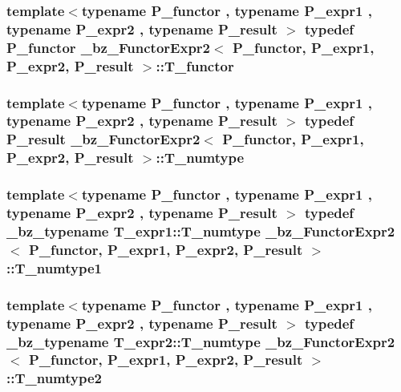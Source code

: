 \subsubsection[{T\+\_\+functor}]{\setlength{\rightskip}{0pt plus 5cm}template$<$typename P\+\_\+functor , typename P\+\_\+expr1 , typename P\+\_\+expr2 , typename P\+\_\+result $>$ typedef P\+\_\+functor {\bf \+\_\+bz\+\_\+\+Functor\+Expr2}$<$ P\+\_\+functor, P\+\_\+expr1, P\+\_\+expr2, P\+\_\+result $>$\+::{\bf T\+\_\+functor}}\label{class__bz__FunctorExpr2_a3fe23ec6c06a2346710d4590986bc1ae}
\hypertarget{class__bz__FunctorExpr2_a72c49dc29bb54d045667666e72ea96a6}{}
\subsubsection[{T\+\_\+numtype}]{\setlength{\rightskip}{0pt plus 5cm}template$<$typename P\+\_\+functor , typename P\+\_\+expr1 , typename P\+\_\+expr2 , typename P\+\_\+result $>$ typedef P\+\_\+result {\bf \+\_\+bz\+\_\+\+Functor\+Expr2}$<$ P\+\_\+functor, P\+\_\+expr1, P\+\_\+expr2, P\+\_\+result $>$\+::{\bf T\+\_\+numtype}}\label{class__bz__FunctorExpr2_a72c49dc29bb54d045667666e72ea96a6}
\hypertarget{class__bz__FunctorExpr2_ae7900fdd57163e00202ee2534db102f9}{}
\subsubsection[{T\+\_\+numtype1}]{\setlength{\rightskip}{0pt plus 5cm}template$<$typename P\+\_\+functor , typename P\+\_\+expr1 , typename P\+\_\+expr2 , typename P\+\_\+result $>$ typedef {\bf \+\_\+bz\+\_\+typename} T\+\_\+expr1\+::\+T\+\_\+numtype {\bf \+\_\+bz\+\_\+\+Functor\+Expr2}$<$ P\+\_\+functor, P\+\_\+expr1, P\+\_\+expr2, P\+\_\+result $>$\+::{\bf T\+\_\+numtype1}}\label{class__bz__FunctorExpr2_ae7900fdd57163e00202ee2534db102f9}
\hypertarget{class__bz__FunctorExpr2_aa8c2406a5dba0757ad6c0de0c95ab026}{}
\subsubsection[{T\+\_\+numtype2}]{\setlength{\rightskip}{0pt plus 5cm}template$<$typename P\+\_\+functor , typename P\+\_\+expr1 , typename P\+\_\+expr2 , typename P\+\_\+result $>$ typedef {\bf \+\_\+bz\+\_\+typename} T\+\_\+expr2\+::\+T\+\_\+numtype {\bf \+\_\+bz\+\_\+\+Functor\+Expr2}$<$ P\+\_\+functor, P\+\_\+expr1, P\+\_\+expr2, P\+\_\+result $>$\+::{\bf T\+\_\+numtype2}}\label{class__bz__FunctorExpr2_aa8c2406a5dba0757ad6c0de0c95ab026}



